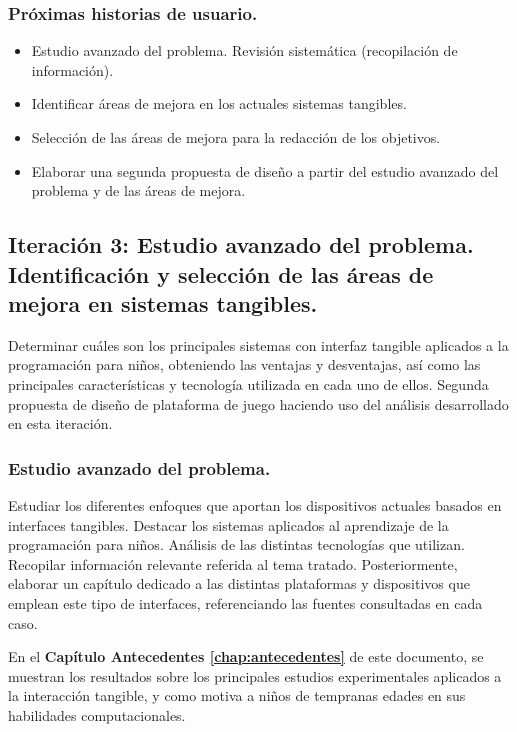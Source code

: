 \subsubsection{Próximas historias de usuario.}

\begin{itemize}
\item Estudio avanzado del problema. Revisión sistemática (recopilación de información).
\item Identificar áreas de mejora en los actuales sistemas tangibles.
\item Selección de las áreas de mejora para la redacción de los objetivos.
\item Elaborar una segunda propuesta de diseño a partir del estudio avanzado del problema y de las áreas de mejora.

\end{itemize}


\subsection{Iteración 3: Estudio avanzado del problema. Identificación y selección de las áreas de mejora en sistemas tangibles.}

Determinar cuáles son los principales sistemas con interfaz tangible aplicados a la programación para niños, obteniendo las ventajas y desventajas, así como las principales características y tecnología utilizada en cada uno de ellos.
Segunda propuesta de diseño de plataforma de juego haciendo uso del análisis desarrollado en esta iteración.



\subsubsection{Estudio avanzado del problema.}


Estudiar los diferentes enfoques que aportan los dispositivos actuales basados en interfaces tangibles. Destacar los sistemas aplicados al aprendizaje de la programación para niños. Análisis de las distintas tecnologías que utilizan.
Recopilar información relevante referida al tema tratado. Posteriormente, elaborar un capítulo dedicado a las distintas plataformas y dispositivos que emplean este tipo de interfaces, referenciando las fuentes consultadas en cada caso.

En el \textbf{Capítulo Antecedentes \ref{chap:antecedentes}} de este documento, se muestran los resultados sobre los principales estudios experimentales aplicados a la interacción tangible, y como motiva a niños de tempranas edades en sus habilidades computacionales.\\


